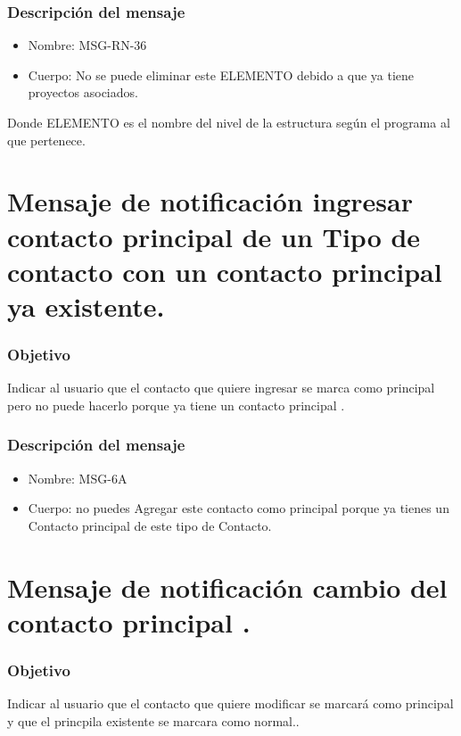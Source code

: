 \subsubsection{Descripción del mensaje}
\begin{itemize}
\item Nombre: MSG-RN-36
\item Cuerpo: No se puede eliminar este ELEMENTO debido a que ya tiene proyectos asociados.
\end{itemize}
Donde ELEMENTO es el nombre del nivel de la estructura según el programa al que pertenece.

\section{Mensaje de notificación ingresar contacto principal de un Tipo de contacto con un contacto principal ya existente.}\label{MSG6A}

\subsubsection{Objetivo}
Indicar al usuario que el contacto que quiere ingresar se marca como principal pero no puede hacerlo porque ya tiene un contacto principal .

\subsubsection{Descripción del mensaje}
\begin{itemize}
\item Nombre: MSG-6A
\item Cuerpo: no puedes Agregar este contacto como principal porque ya tienes un Contacto principal de este tipo de Contacto.

\end{itemize}

\section{Mensaje de notificación cambio del contacto principal .}\label{MSG7A}

\subsubsection{Objetivo}
Indicar al usuario que el contacto que quiere modificar se marcará como principal y que el princpila existente se marcara como normal..

